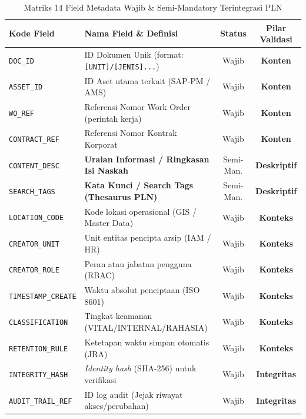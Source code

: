 \documentclass[12pt,a4paper]{report}
\begin{document}
\begin{table}[htbp]
\centering
\small
\caption{Matriks 14 Field Metadata Wajib \& Semi-Mandatory Terintegrasi PLN}
\begin{tabularx}{\textwidth}{@{} l >{\raggedright\arraybackslash}X c c @{}}
\toprule
\textbf{Kode Field} & \textbf{Nama Field \& Definisi} & \textbf{Status} & \textbf{Pilar Validasi} \\
\midrule
\texttt{DOC\_ID} & ID Dokumen Unik (format: \texttt{[UNIT]/[JENIS]...}) & Wajib & \textbf{Konten} \\
\texttt{ASSET\_ID} & ID Aset utama terkait (SAP-PM / AMS) & Wajib & \textbf{Konten} \\
\texttt{WO\_REF} & Referensi Nomor Work Order (perintah kerja) & Wajib & \textbf{Konten} \\
\texttt{CONTRACT\_REF} & Referensi Nomor Kontrak Korporat & Wajib & \textbf{Konten} \\
\texttt{CONTENT\_DESC} & \textbf{Uraian Informasi / Ringkasan Isi Naskah} & Semi-Man. & \textbf{Deskriptif} \\
\texttt{SEARCH\_TAGS} & \textbf{Kata Kunci / Search Tags (Thesaurus PLN)} & Semi-Man. & \textbf{Deskriptif} \\
\texttt{LOCATION\_CODE} & Kode lokasi operasional (GIS / Master Data) & Wajib & \textbf{Konteks} \\
\texttt{CREATOR\_UNIT} & Unit entitas pencipta arsip (IAM / HR) & Wajib & \textbf{Konteks} \\
\texttt{CREATOR\_ROLE} & Peran atau jabatan pengguna (RBAC) & Wajib & \textbf{Konteks} \\
\texttt{TIMESTAMP\_CREATE} & Waktu absolut penciptaan (ISO 8601) & Wajib & \textbf{Konteks} \\
\texttt{CLASSIFICATION} & Tingkat keamanan (VITAL/INTERNAL/RAHASIA) & Wajib & \textbf{Konteks} \\
\texttt{RETENTION\_RULE} & Ketetapan waktu simpan otomatis (JRA) & Wajib & \textbf{Konteks} \\
\texttt{INTEGRITY\_HASH} & \textit{Identity hash} (SHA-256) untuk verifikasi & Wajib & \textbf{Integritas} \\
\texttt{AUDIT\_TRAIL\_REF} & ID log audit (Jejak riwayat akses/perubahan) & Wajib & \textbf{Integritas} \\
\bottomrule
\end{tabularx}
\end{table}
\end{document}
